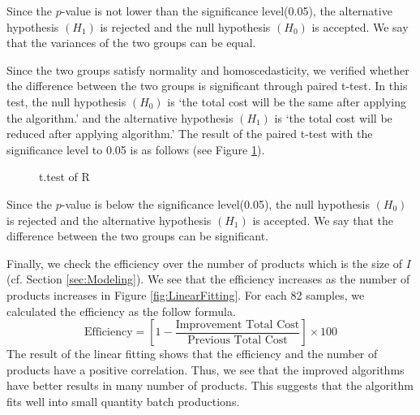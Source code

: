 \documentclass[a4paper]{amsart}
\numberwithin{equation}{section} %
\numberwithin{figure}{section} %
\numberwithin{table}{section}
\theoremstyle{plain}
\theoremstyle{definition}
\theoremstyle{plain}
\theoremstyle{plain}
\theoremstyle{plain}
\theoremstyle{plain}
\theoremstyle{plain}
\begin{document}
Since the $p$-value is not lower than the significance level(0.05), the alternative hypothesis $(H_{1})$ is rejected and the null hypothesis $(H_{0})$ is accepted. 
We say that the variances of the two groups can be equal.

Since the two groups satisfy normality and homoscedasticity, we verified whether the difference between the two groups is significant through paired t-test. In this test, the null hypothesis $(H_{0})$ is `the total cost will be the same after applying the algorithm.' and the alternative hypothesis $(H_{1})$ is `the total cost will be reduced after applying algorithm.' The result of the paired t-test with the significance level to 0.05 is as follows (see Figure \ref{fig:ttest}).

\begin{figure}[h!]
	\centering
	\caption{t.test of R}
	\label{fig:ttest}       %
\end{figure}

Since the $p$-value is below the significance level(0.05), the null hypothesis $(H_{0})$ is rejected and the alternative hypothesis $(H_{1})$ is accepted. We say that the difference between the two groups can be significant.

Finally, we check the efficiency over the number of products which is the size of $I$(cf. Section \ref{sec:Modeling}).
We see that the efficiency increases as the number of products increases in Figure \ref{fig:LinearFitting}.
For each 82 samples, we calculated the efficiency as the follow formula.
\begin{equation}
	\textrm{Efficiency} = \left[1-\frac{\textrm{Improvement~Total~Cost}}{\textrm{Previous~Total~Cost}}\right]\times 100
\end{equation}
The result of the linear fitting shows that the efficiency and the number of products have a positive correlation.
Thus, we see that the improved algorithms have better results in many number of products.
This suggests that the algorithm fits well into small quantity batch productions.
\end{document}
